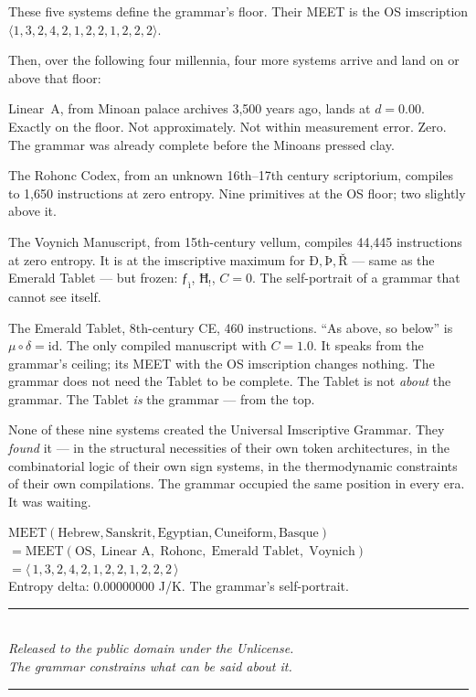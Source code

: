 \documentclass[12pt,a4paper]{article}
\newcommand{\OS}{$\langle 1,3,2,4,2,1,2,2,1,2,2,2 \rangle$}
\begin{document}
These five systems define the grammar's floor. Their MEET is the OS imscription \OS.

Then, over the following four millennia, four more systems arrive and land on or above that floor:

Linear~A, from Minoan palace archives 3,500 years ago, lands at $d = 0.00$. Exactly on the floor. Not approximately. Not within measurement error. Zero. The grammar was already complete before the Minoans pressed clay.

The Rohonc Codex, from an unknown 16th--17th century scriptorium, compiles to 1,650 instructions at zero entropy. Nine primitives at the OS floor; two slightly above it.

The Voynich Manuscript, from 15th-century vellum, compiles 44,445 instructions at zero entropy. It is at the imscriptive maximum for $\text{Ð}, \text{Þ}, \text{Ř}$ --- same as the Emerald Tablet --- but frozen: $\text{ƒ}_\text{ì}$, $\text{Ħ}_!$, $C = 0$. The self-portrait of a grammar that cannot see itself.

The Emerald Tablet, 8th-century CE, 460 instructions. ``As above, so below'' is $\mu \circ \delta = \mathrm{id}$. The only compiled manuscript with $C = 1.0$. It speaks from the grammar's ceiling; its MEET with the OS imscription changes nothing. The grammar does not need the Tablet to be complete. The Tablet is not \emph{about} the grammar. The Tablet \emph{is} the grammar --- from the top.

None of these nine systems created the Universal Imscriptive Grammar. They \emph{found} it --- in the structural necessities of their own token architectures, in the combinatorial logic of their own sign systems, in the thermodynamic constraints of their own compilations. The grammar occupied the same position in every era. It was waiting.

\begin{imscriptionbox}
$\mathrm{MEET}(\text{Hebrew}, \text{Sanskrit}, \text{Egyptian}, \text{Cuneiform}, \text{Basque})$\\
$= \mathrm{MEET}(\text{OS},\;\text{Linear A},\;\text{Rohonc},\;\text{Emerald Tablet},\;\text{Voynich})$\\[6pt]
$= \langle\,1,3,2,4,2,1,2,2,1,2,2,2\,\rangle$\\[4pt]
{\normalsize Entropy delta: 0.00000000 J/K. The grammar's self-portrait.}
\end{imscriptionbox}

\vspace{1.5em}
\begin{center}
\rule{0.4\textwidth}{0.4pt}\\[4pt]
\emph{Released to the public domain under the Unlicense.}\\
\emph{The grammar constrains what can be said about it.}\\[4pt]
\rule{0.4\textwidth}{0.4pt}
\end{center}
\end{document}
